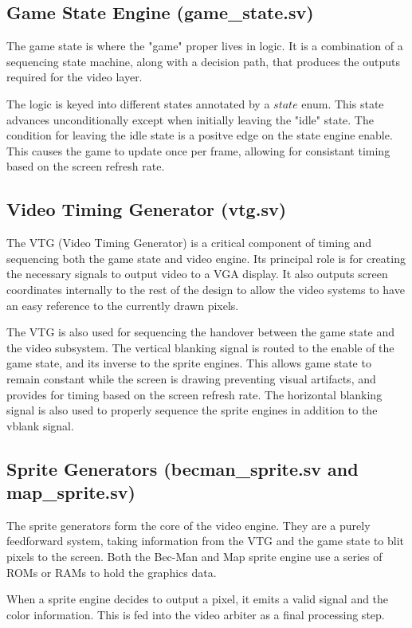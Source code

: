 \documentclass[12pt]{article}
\begin{document}
\subsection{Game State Engine (game\_state.sv)}
The game state is where the "game" proper lives in logic. It is a combination of
a sequencing state machine, along with a decision path, that produces the
outputs required for the video layer.

The logic is keyed into different states annotated by a $state$ enum. This state
advances unconditionally except when initially leaving the "idle" state. The
condition for leaving the idle state is a positve edge on the state engine
enable. This causes the game to update once per frame, allowing for consistant
timing based on the screen refresh rate.

\subsection{Video Timing Generator (vtg.sv)}
The VTG (Video Timing Generator) is a critical component of timing and sequencing both the game state and
video engine. Its principal role is for creating the necessary signals to output
video to a VGA display. It also outputs screen coordinates internally
to the rest of the design to allow the video systems to have an easy reference 
to the currently drawn pixels.

The VTG is also used for sequencing the handover between the game state and the
video subsystem. The vertical blanking signal is routed to the enable of the
game state, and its inverse to the sprite engines. This allows game state to
remain constant while the screen is drawing preventing visual artifacts, and
provides for timing based on the screen refresh rate. The horizontal blanking
signal is also used to properly sequence the sprite engines in addition to the
vblank signal.

\subsection{Sprite Generators (becman\_sprite.sv and map\_sprite.sv)}
The sprite generators form the core of the video engine. They are a purely
feedforward system, taking information from the VTG and the game state to blit
pixels to the screen. Both the Bec-Man and Map sprite engine use a series of
ROMs or RAMs to hold the graphics data.

When a sprite engine decides to output a pixel, it emits a valid signal and the
color information. This is fed into the video arbiter as a final processing
step.
\end{document}
